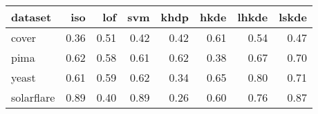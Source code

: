 \begin{tabular}{lrrrrrrr}
  \hline
dataset & iso & lof & svm & khdp & hkde & lhkde & lskde \\ 
  \hline
cover & 0.36 & 0.51 & 0.42 & 0.42 & 0.61 & 0.54 & 0.47 \\ 
  pima & 0.62 & 0.58 & 0.61 & 0.62 & 0.38 & 0.67 & 0.70 \\ 
  yeast & 0.61 & 0.59 & 0.62 & 0.34 & 0.65 & 0.80 & 0.71 \\ 
  solarflare & 0.89 & 0.40 & 0.89 & 0.26 & 0.60 & 0.76 & 0.87 \\ 
   \hline
\end{tabular}
